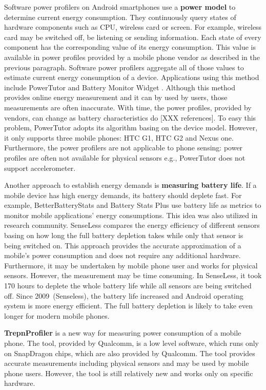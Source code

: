 Software power profilers on Android smartphones use a \textbf{power model} to determine current energy consumption. They continuously query states of hardware components such as CPU, wireless card or screen. For example, wireless card may be switched off, be listening or sending information. Each state of every component has the corresponding value of its energy consumption. This value is available in power profiles provided by a mobile phone vendor as described in the previous paragraph. Software power profilers aggregate all of those values to estimate current energy consumption of a device. Applications using this method include PowerTutor \cite{zhang:powertutor} and Battery Monitor Widget \cite{googleplay:batterymonitorwidget}. Although this method provides online energy measurement and it can by used by users, those measurements are often inaccurate. With time, the power profiles, provided by vendors, can change as battery characteristics do [XXX references]. To easy this problem, PowerTutor adopts its algorithm basing on the device model. However, it only supports three mobile phones: HTC G1, HTC G2 and Nexus one. Furthermore, the power profilers are not applicable to phone sensing: power profiles are often not available for physical sensors e.g., PowerTutor does not support accelerometer.

Another approach to establish energy demands is \textbf{measuring battery life}. If a mobile device has high energy demands, its battery should deplete fast. For example, BetterBatteryStats \cite{googleplay:betterbatterystats} and Battery Stats Plus \cite{googleplay:batterystatsplus} use battery life as metrics to monitor mobile applications' energy consumptions. This idea was also utilized in research community. SenseLess \cite{benabdesslem:senseless} compares the energy efficiency of different sensors basing on how long the full battery depletion takes while only that sensor is being switched on. This approach provides the accurate approximation of a mobile's power consumption and does not require any additional hardware. Furthermore, it may be undertaken by mobile phone user and works for physical sensors. However, the measurement may be time consuming. In SenseLess, it took 170 hours to deplete the whole battery life while all sensors are being switched off. Since 2009\ (Senseless), the battery life increased and Android operating system is more energy efficient. The full battery depletion is likely to take even longer for modern mobile phones.

\textbf{TrepnProfiler} \cite{qualcomm:trepnprofiler} is a new way for measuring power consumption of a mobile phone. The tool, provided by Qualcomm, is a low level software, which runs only on SnapDragon chips, which are also provided by Qualcomm. The tool provides accurate measurements including physical sensors and may be used by mobile phone users. However, the tool is still relatively new and works only on specific hardware.

